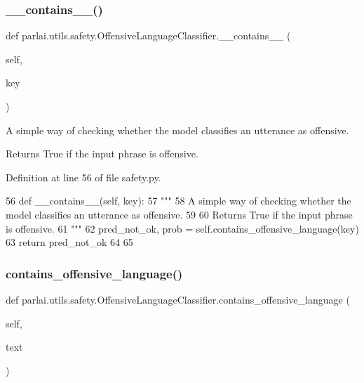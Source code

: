 \subsubsection{\texorpdfstring{\+\_\+\+\_\+contains\+\_\+\+\_\+()}{\_\_contains\_\_()}}
{\footnotesize\ttfamily def parlai.\+utils.\+safety.\+Offensive\+Language\+Classifier.\+\_\+\+\_\+contains\+\_\+\+\_\+ (\begin{DoxyParamCaption}\item[{}]{self,  }\item[{}]{key }\end{DoxyParamCaption})}

\begin{DoxyVerb}A simple way of checking whether the model classifies an utterance as offensive.

Returns True if the input phrase is offensive.
\end{DoxyVerb}
 

Definition at line 56 of file safety.\+py.


\begin{DoxyCode}
56     \textcolor{keyword}{def }\_\_contains\_\_(self, key):
57         \textcolor{stringliteral}{"""}
58 \textcolor{stringliteral}{        A simple way of checking whether the model classifies an utterance as offensive.}
59 \textcolor{stringliteral}{}
60 \textcolor{stringliteral}{        Returns True if the input phrase is offensive.}
61 \textcolor{stringliteral}{        """}
62         pred\_not\_ok, prob = self.contains\_offensive\_language(key)
63         \textcolor{keywordflow}{return} pred\_not\_ok
64 
65 
\end{DoxyCode}
\mbox{\label{classparlai_1_1utils_1_1safety_1_1OffensiveLanguageClassifier_a7f4e833bea93ab9f920f2dd2a4b6e586}} 
\subsubsection{\texorpdfstring{contains\+\_\+offensive\+\_\+language()}{contains\_offensive\_language()}}
{\footnotesize\ttfamily def parlai.\+utils.\+safety.\+Offensive\+Language\+Classifier.\+contains\+\_\+offensive\+\_\+language (\begin{DoxyParamCaption}\item[{}]{self,  }\item[{}]{text }\end{DoxyParamCaption})}

